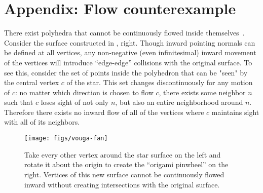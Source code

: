 \section*{Appendix: Flow counterexample}
%
\label{app:counterexample}
%
There exist polyhedra that cannot be continuously flowed inside themselves~\cite{Mathoverflow:206750}.
%
Consider the surface constructed in , right. Though inward
pointing normals can be defined at all vertices, any non-negative (even
infinitesimal) inward movement of the vertices will introduce ``edge-edge''
collisions with the original surface.
%
To see this, consider the set of points inside the polyhedron that can be "seen" by the central vertex $c$ of the star. This set changes discontinuously for any motion of $c$: no matter which direction is chosen to flow $c$, there exists some neighbor $n$ such that $c$ loses sight of not only $n$, but also an entire neighborhood around $n$. Therefore there exists no inward flow of all of the vertices where $c$ maintains sight with all of its neighbors.
\begin{figure}[hb]
\texttt{[image: figs/vouga-fan]}
\caption{Take every other vertex around the star surface on the left and
rotate it about the origin to create the ``origami pinwheel'' on the right.
Vertices of this new surface cannot be continuously flowed inward without
creating intersections with the original surface.}
\label{fig:vouga-fan}
\end{figure}
